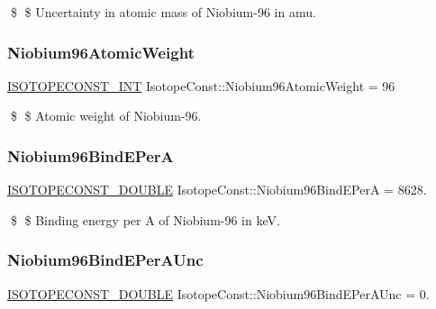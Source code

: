 \$ \$ Uncertainty in atomic mass of Niobium-\/96 in amu. \mbox{\label{group___isotope_const-_niobium-_nb96_ga72b351b85d0010c2e1b55522158c8d0e}} 
\subsubsection{\texorpdfstring{Niobium96\+Atomic\+Weight}{Niobium96AtomicWeight}}
{\footnotesize\ttfamily \mbox{\hyperlink{group___isotope_const-_macros_ga5f18360b3e99483a35c32d789e62621c}{I\+S\+O\+T\+O\+P\+E\+C\+O\+N\+S\+T\+\_\+\+I\+NT}} Isotope\+Const\+::\+Niobium96\+Atomic\+Weight = 96}

\$ \$ Atomic weight of Niobium-\/96. \mbox{\label{group___isotope_const-_niobium-_nb96_ga79de12c480e59d2d74f26ea1c4f44014}} 
\subsubsection{\texorpdfstring{Niobium96\+Bind\+E\+PerA}{Niobium96BindEPerA}}
{\footnotesize\ttfamily \mbox{\hyperlink{group___isotope_const-_macros_ga8f45a7272ce02c0b4c65c44636ed719a}{I\+S\+O\+T\+O\+P\+E\+C\+O\+N\+S\+T\+\_\+\+D\+O\+U\+B\+LE}} Isotope\+Const\+::\+Niobium96\+Bind\+E\+PerA = 8628.}

\$ \$ Binding energy per A of Niobium-\/96 in keV. \mbox{\label{group___isotope_const-_niobium-_nb96_gae1e2cfd21f6ad00d23ca65891528465d}} 
\subsubsection{\texorpdfstring{Niobium96\+Bind\+E\+Per\+A\+Unc}{Niobium96BindEPerAUnc}}
{\footnotesize\ttfamily \mbox{\hyperlink{group___isotope_const-_macros_ga8f45a7272ce02c0b4c65c44636ed719a}{I\+S\+O\+T\+O\+P\+E\+C\+O\+N\+S\+T\+\_\+\+D\+O\+U\+B\+LE}} Isotope\+Const\+::\+Niobium96\+Bind\+E\+Per\+A\+Unc = 0.}

